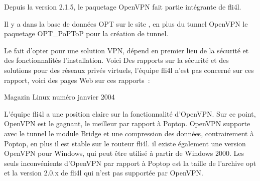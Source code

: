 

\sloppy

Depuis la version 2.1.5, le paquetage OpenVPN fait partie intégrante de fli4l.


Il y a dans la base de données OPT sur le site ,
en plus du tunnel OpenVPN le paquetage OPT\_PoPToP pour la création de tunnel.

Le fait d'opter pour une solution VPN, dépend en premier lieu de la sécurité et des
fonctionnalités l'installation. Voici Des rapports sur la sécurité et des solutions
pour des réseaux privés virtuels, l'équipe fli4l n'est pas concerné sur ces rapport,
voici des pages Web sur ces rapports~:

Magazin Linux numéro janvier 2004





L'équipe fli4l a une position claire sur la fonctionnalité d'OpenVPN. Sur ce point,
OpenVPN est le gagnant, le meilleur par rapport à Poptop. OpenVPN supporte
avec le tunnel le module Bridge et une compression des données, contrairement à Poptop,
en plus il est stable sur le routeur fli4l. il existe également une version OpenVPN
pour Windows, qui peut être utilisé à partir de Windows 2000. Les seuls inconvénients
d'OpenVPN par rapport à Poptop est la taille de l'archive opt et la version
2.0.x de fli4l qui n'est pas supportée par OpenVPN.


